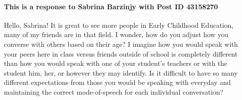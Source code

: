    \paragraph{This is a response to Sabrina Barzinjy with Post ID 43158270}
      Hello, Sabrina! It is great to see more people in Early Childhood
        Education, many of my friends are in that field. I wonder, how do you
        adjust how you converse with others based on their age? I imagine how
        you would speak with your peers here in class versus friends outside of
        school is completely different than how you would speak with one of
        your student's teachers or with the student him, her, or however they
        may identify. Is it difficult to have so many different expectations
        from those you would be speaking with everyday and maintaining the
        correct mode-of-speech for each individual conversation?
